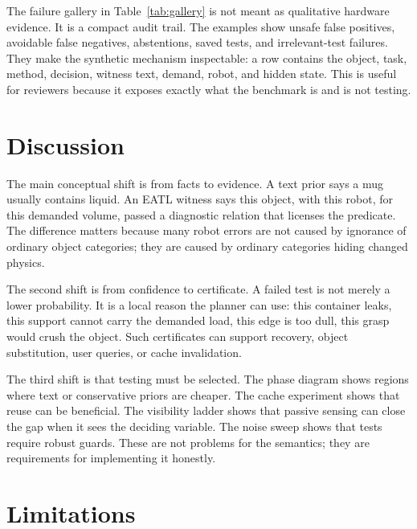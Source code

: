\documentclass{article}
\begin{document}
The failure gallery in Table~\ref{tab:gallery} is not meant as qualitative
hardware evidence.  It is a compact audit trail.  The examples show unsafe
false positives, avoidable false negatives, abstentions, saved tests, and
irrelevant-test failures.  They make the synthetic mechanism inspectable: a row
contains the object, task, method, decision, witness text, demand, robot, and
hidden state.  This is useful for reviewers because it exposes exactly what the
benchmark is and is not testing.

\begin{table}[t]
\centering
\scriptsize
\resizebox{\linewidth}{!}{}
\caption{Representative failure-gallery rows.  The full CSV records bounded
examples from the main family.}
\label{tab:gallery}
\end{table}

\section{Discussion}

The main conceptual shift is from facts to evidence.  A text prior says a mug
usually contains liquid.  An EATL witness says this object, with this robot, for
this demanded volume, passed a diagnostic relation that licenses the predicate.
The difference matters because many robot errors are not caused by ignorance of
ordinary object categories; they are caused by ordinary categories hiding
changed physics.

The second shift is from confidence to certificate.  A failed test is not merely
a lower probability.  It is a local reason the planner can use: this container
leaks, this support cannot carry the demanded load, this edge is too dull, this
grasp would crush the object.  Such certificates can support recovery, object
substitution, user queries, or cache invalidation.

The third shift is that testing must be selected.  The phase diagram shows
regions where text or conservative priors are cheaper.  The cache experiment
shows that reuse can be beneficial.  The visibility ladder shows that passive
sensing can close the gap when it sees the deciding variable.  The noise sweep
shows that tests require robust guards.  These are not problems for the
semantics; they are requirements for implementing it honestly.

\section{Limitations}
\end{document}
